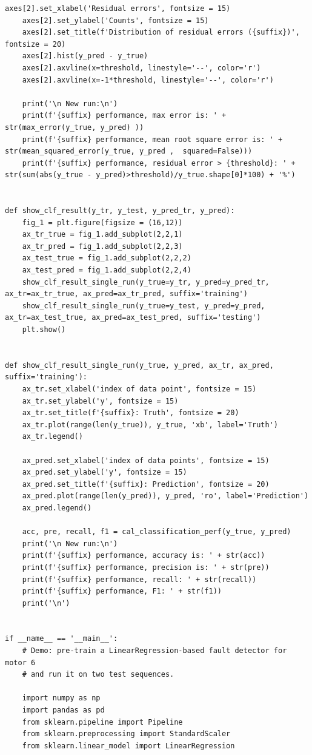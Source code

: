 \documentclass[11pt,a4paper]{article}
\begin{document}
\begin{lstlisting}[style=pyfull]
    axes[2].set_xlabel('Residual errors', fontsize = 15)
    axes[2].set_ylabel('Counts', fontsize = 15)
    axes[2].set_title(f'Distribution of residual errors ({suffix})', fontsize = 20)
    axes[2].hist(y_pred - y_true)
    axes[2].axvline(x=threshold, linestyle='--', color='r')
    axes[2].axvline(x=-1*threshold, linestyle='--', color='r')

    print('\n New run:\n')
    print(f'{suffix} performance, max error is: ' + str(max_error(y_true, y_pred) ))
    print(f'{suffix} performance, mean root square error is: ' + str(mean_squared_error(y_true, y_pred ,  squared=False)))
    print(f'{suffix} performance, residual error > {threshold}: ' + str(sum(abs(y_true - y_pred)>threshold)/y_true.shape[0]*100) + '%')


def show_clf_result(y_tr, y_test, y_pred_tr, y_pred):
    fig_1 = plt.figure(figsize = (16,12))
    ax_tr_true = fig_1.add_subplot(2,2,1)
    ax_tr_pred = fig_1.add_subplot(2,2,3)
    ax_test_true = fig_1.add_subplot(2,2,2)
    ax_test_pred = fig_1.add_subplot(2,2,4)
    show_clf_result_single_run(y_true=y_tr, y_pred=y_pred_tr, ax_tr=ax_tr_true, ax_pred=ax_tr_pred, suffix='training')
    show_clf_result_single_run(y_true=y_test, y_pred=y_pred, ax_tr=ax_test_true, ax_pred=ax_test_pred, suffix='testing')
    plt.show()


def show_clf_result_single_run(y_true, y_pred, ax_tr, ax_pred, suffix='training'):
    ax_tr.set_xlabel('index of data point', fontsize = 15)
    ax_tr.set_ylabel('y', fontsize = 15)
    ax_tr.set_title(f'{suffix}: Truth', fontsize = 20)
    ax_tr.plot(range(len(y_true)), y_true, 'xb', label='Truth')
    ax_tr.legend()

    ax_pred.set_xlabel('index of data points', fontsize = 15)
    ax_pred.set_ylabel('y', fontsize = 15)
    ax_pred.set_title(f'{suffix}: Prediction', fontsize = 20)
    ax_pred.plot(range(len(y_pred)), y_pred, 'ro', label='Prediction')
    ax_pred.legend()

    acc, pre, recall, f1 = cal_classification_perf(y_true, y_pred)
    print('\n New run:\n')
    print(f'{suffix} performance, accuracy is: ' + str(acc))
    print(f'{suffix} performance, precision is: ' + str(pre))
    print(f'{suffix} performance, recall: ' + str(recall))
    print(f'{suffix} performance, F1: ' + str(f1))
    print('\n')


if __name__ == '__main__':
    # Demo: pre-train a LinearRegression-based fault detector for motor 6
    # and run it on two test sequences.

    import numpy as np
    import pandas as pd
    from sklearn.pipeline import Pipeline
    from sklearn.preprocessing import StandardScaler
    from sklearn.linear_model import LinearRegression



\end{lstlisting}
\end{document}
